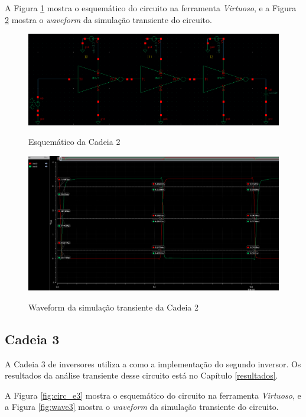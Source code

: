 \documentclass{iiufrgs}
\newcommand{\virtuoso}{\textit{Virtuoso}}
\begin{document}
A Figura \ref{fig:circ_e2} mostra o esquemático do circuito na ferramenta \virtuoso, e a Figura \ref{fig:wave2} mostra o \textit{waveform} da simulação transiente do circuito.\

\begin{figure}[htbp]
    \centering
    \caption{Esquemático da Cadeia 2}
    \includegraphics[scale=0.33]{images/circ2.png}
    \label{fig:circ_e2}
\end{figure}

\begin{figure}[htbp]
    \centering
    \caption{Waveform da simulação transiente da Cadeia 2}
    \includegraphics[scale=0.4]{images/wave_ex2.png}
    \label{fig:wave2}
\end{figure}

\FloatBarrier

\subsection{Cadeia 3}
A Cadeia 3 de inversores utiliza a  como a implementação do segundo inversor. Os resultados da análise transiente desse circuito está no Capítulo \ref{resultados}.\

A Figura \ref{fig:circ_e3} mostra o esquemático do circuito na ferramenta \virtuoso, e a Figura \ref{fig:wave3} mostra o \textit{waveform} da simulação transiente do circuito.\
\end{document}
